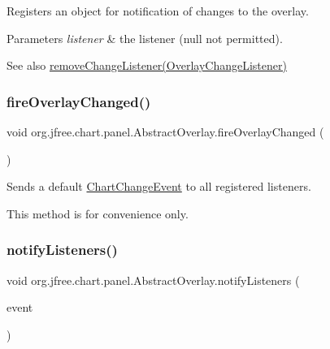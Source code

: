 Registers an object for notification of changes to the overlay.


\begin{DoxyParams}{Parameters}
{\em listener} & the listener ({\ttfamily null} not permitted).\\
\hline
\end{DoxyParams}
\begin{DoxySeeAlso}{See also}
\mbox{\hyperlink{classorg_1_1jfree_1_1chart_1_1panel_1_1_abstract_overlay_a0b069ed367855570b9ac89ff324a881a}{remove\+Change\+Listener(\+Overlay\+Change\+Listener)}} 
\end{DoxySeeAlso}
\mbox{\label{classorg_1_1jfree_1_1chart_1_1panel_1_1_abstract_overlay_acfdb838b5dc44a788fdbddfbfb86e36d}} 
\subsubsection{\texorpdfstring{fire\+Overlay\+Changed()}{fireOverlayChanged()}}
{\footnotesize\ttfamily void org.\+jfree.\+chart.\+panel.\+Abstract\+Overlay.\+fire\+Overlay\+Changed (\begin{DoxyParamCaption}{ }\end{DoxyParamCaption})}

Sends a default \mbox{\hyperlink{}{Chart\+Change\+Event}} to all registered listeners. 

This method is for convenience only. \mbox{\label{classorg_1_1jfree_1_1chart_1_1panel_1_1_abstract_overlay_ad44849c30d75a72d225912cc8e03bc00}} 
\subsubsection{\texorpdfstring{notify\+Listeners()}{notifyListeners()}}
{\footnotesize\ttfamily void org.\+jfree.\+chart.\+panel.\+Abstract\+Overlay.\+notify\+Listeners (\begin{DoxyParamCaption}\item[{\mbox{\hyperlink{classorg_1_1jfree_1_1chart_1_1event_1_1_overlay_change_event}{Overlay\+Change\+Event}}}]{event }\end{DoxyParamCaption})\hspace{0.3cm}{\ttfamily [protected]}}

